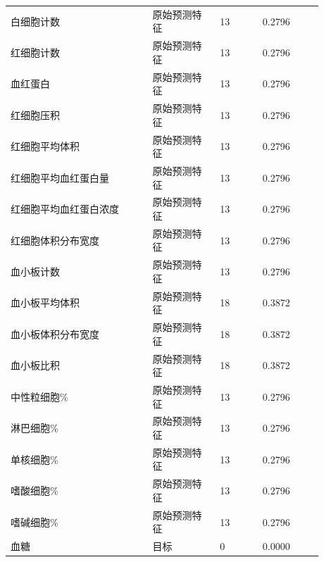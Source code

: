 \begin{longtable}{L{0.4\linewidth}L{0.19\linewidth}L{0.12\linewidth}L{0.17\linewidth}}
白细胞计数 & 原始预测特征 & 13 & 0.2796 \\
红细胞计数 & 原始预测特征 & 13 & 0.2796 \\
血红蛋白 & 原始预测特征 & 13 & 0.2796 \\
红细胞压积 & 原始预测特征 & 13 & 0.2796 \\
红细胞平均体积 & 原始预测特征 & 13 & 0.2796 \\
红细胞平均血红蛋白量 & 原始预测特征 & 13 & 0.2796 \\
红细胞平均血红蛋白浓度 & 原始预测特征 & 13 & 0.2796 \\
红细胞体积分布宽度 & 原始预测特征 & 13 & 0.2796 \\
血小板计数 & 原始预测特征 & 13 & 0.2796 \\
血小板平均体积 & 原始预测特征 & 18 & 0.3872 \\
血小板体积分布宽度 & 原始预测特征 & 18 & 0.3872 \\
血小板比积 & 原始预测特征 & 18 & 0.3872 \\
中性粒细胞\% & 原始预测特征 & 13 & 0.2796 \\
淋巴细胞\% & 原始预测特征 & 13 & 0.2796 \\
单核细胞\% & 原始预测特征 & 13 & 0.2796 \\
嗜酸细胞\% & 原始预测特征 & 13 & 0.2796 \\
嗜碱细胞\% & 原始预测特征 & 13 & 0.2796 \\
血糖 & 目标 & 0 & 0.0000 \\
\bottomrule
\end{longtable}
\endgroup

